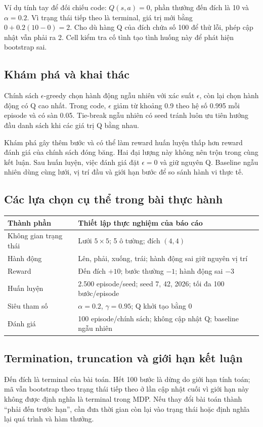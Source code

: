 Ví dụ tính tay để đối chiếu code: $Q(s,a)=0$, phần thưởng đến đích là 10 và
$\alpha=0.2$. Vì trạng thái tiếp theo là terminal, giá trị mới bằng
$0+0.2(10-0)=2$. Cho dù hàng Q của đích chứa số 100 để thử lỗi, phép cập nhật vẫn phải
ra 2. Cell kiểm tra cố tình tạo tình huống này để phát hiện bootstrap sai.

\subsection{Khám phá và khai thác}
Chính sách $\epsilon$-greedy chọn hành động ngẫu nhiên với xác suất $\epsilon$, còn lại
chọn hành động có Q cao nhất. Trong code, $\epsilon$ giảm từ khoảng 0.9 theo hệ số
0.995 mỗi episode và có sàn 0.05. Tie-break ngẫu nhiên có seed tránh luôn ưu tiên
hướng đầu danh sách khi các giá trị Q bằng nhau.

Khám phá gây thêm bước và có thể làm reward huấn luyện thấp hơn reward đánh giá của
chính sách đóng băng. Hai đại lượng này không nên trộn trong cùng kết luận.
Sau huấn luyện, việc đánh giá đặt $\epsilon=0$ và giữ nguyên Q. Baseline ngẫu nhiên
dùng cùng lưới, vị trí đầu và giới hạn bước để so sánh hành vi thực tế.

\subsection{Các lựa chọn cụ thể trong bài thực hành}
\begin{center}\small
\begin{tabularx}{\linewidth}{@{}p{3.6cm}X@{}}\toprule
\textbf{Thành phần} & \textbf{Thiết lập thực nghiệm của báo cáo}\\\midrule
Không gian trạng thái & Lưới $5\times5$; 5 ô tường; đích $(4,4)$\\
Hành động & Lên, phải, xuống, trái; hành động sai giữ nguyên vị trí\\
Reward & Đến đích $+10$; bước thường $-1$; hành động sai $-3$\\
Huấn luyện & 2.500 episode/seed; seed 7, 42, 2026; tối đa 100 bước/episode\\
Siêu tham số & $\alpha=0.2$, $\gamma=0.95$; Q khởi tạo bằng 0\\
Đánh giá & 100 episode/chính sách; không cập nhật Q; baseline ngẫu nhiên\\\bottomrule
\end{tabularx}\end{center}

\subsection{Termination, truncation và giới hạn kết luận}
Đến đích là terminal của bài toán. Hết 100 bước là dừng do giới hạn tính toán; mã vẫn
bootstrap theo trạng thái tiếp theo ở lần cập nhật cuối vì giới hạn này không được
định nghĩa là terminal trong MDP. Nếu thay đổi bài toán thành ``phải đến trước hạn'',
cần đưa thời gian còn lại vào trạng thái hoặc định nghĩa lại quá trình và hàm thưởng.

